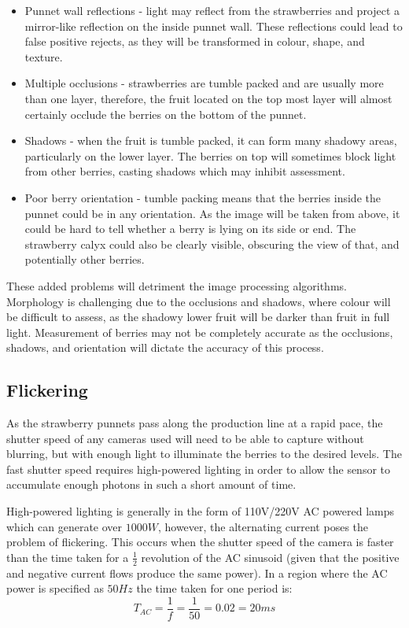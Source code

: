 \documentclass[fleqn,twoside,12pt]{report}
\begin{document}
\begin{itemize}
	\item Punnet wall reflections - light may reflect from the strawberries and project a mirror-like reflection on the inside punnet wall. These reflections could lead to false positive rejects, as they will be transformed in colour, shape, and texture.
	\item Multiple occlusions - strawberries are tumble packed and are usually more than one layer, therefore, the fruit located on the top most layer will almost certainly occlude the berries on the bottom of the punnet. 
	\item Shadows - when the fruit is tumble packed, it can form many shadowy areas, particularly on the lower layer. The berries on top will sometimes block light from other berries, casting shadows which may inhibit assessment.
	\item Poor berry orientation - tumble packing means that the berries inside the punnet could be in any orientation. As the image will be taken from above, it could be hard to tell whether a berry is lying on its side or end. The strawberry calyx could also be clearly visible, obscuring the view of that, and potentially other berries. 
\end{itemize}

These added problems will detriment the image processing algorithms. Morphology is challenging due to the occlusions and shadows, where colour will be difficult to assess, as the shadowy lower fruit will be darker than fruit in full light. Measurement of berries may not be completely accurate as the occlusions, shadows, and orientation will dictate the accuracy of this process.


\subsection{Flickering}

As the strawberry punnets pass along the production line at a rapid pace, the shutter speed of any cameras used will need to be able to capture without blurring, but with enough light to illuminate the berries to the desired levels. The fast shutter speed requires high-powered lighting in order to allow the sensor to accumulate enough photons in such a short amount of time.

High-powered lighting is generally in the form of 110V/220V AC powered lamps which can generate over $1000W$, however, the alternating current poses the problem of flickering. This occurs when the shutter speed of the camera is faster than the time taken for a $\frac{1}{2}$ revolution of the AC sinusoid (given that the positive and negative current flows produce the same power). In a region where the AC power is specified as $50Hz$ the time taken for one period is: 
\begin{equation}
T_{AC} = \frac{1}{f} = \frac{1}{50} = 0.02 = 20ms
\end{equation}
\end{document}

